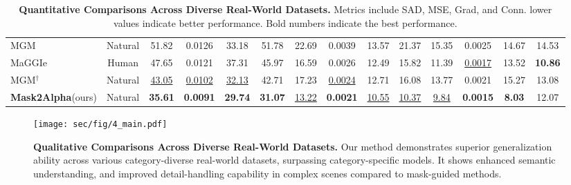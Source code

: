 \begin{table*}[t]
{\begin{tabular}{l|c|c|c|c|c|c|c|c|c|c|c|c|c}
    MGM~\cite{yu2021mgm} & Natural            & 51.82 & 0.0126 & 33.18 & 51.78 & 22.69 & 0.0039 & 13.57 & 21.37 & 15.35 & 0.0025 & 14.67 & 14.53 \\
    MaGGIe~\cite{huynh2024maggie} & Human     & 47.65 & 0.0121 & 37.31 & 45.97 & 16.59 & 0.0026 & 12.49 & 15.82 & 11.39 & \underline{0.0017} & 13.52 & \textbf{10.86} \\
    MGM$^\dagger$~\cite{park2023mgmwild}& Natural & \underline{43.05} & \underline{0.0102} & \underline{32.13} & 42.71 & 17.23 & \underline{0.0024} & 12.71 & 16.08 & 13.77 & 0.0021 & 15.27 & 13.08 \\
    \textbf{Mask2Alpha}(ours) & Natural & \textbf{35.61} & \textbf{0.0091} & \textbf{29.74} & \textbf{31.07} & \underline{13.22} & \textbf{0.0021} & \underline{10.55} & 
    \underline{10.37} & \underline{9.84} & \textbf{0.0015} & \textbf{8.03} & 12.07 \\

        \hline\hline       
    \end{tabular}}
    \vspace{-0.1in}
    \caption{{\bf Quantitative Comparisons Across Diverse Real-World Datasets.} Metrics include SAD, MSE, Grad, and Conn. lower values indicate better performance. Bold numbers indicate the best performance.}
    \label{tab:main}
    \vspace{-0.1in}
\end{table*}

\begin{figure*}
    \centering
    \texttt{[image: sec/fig/4\_main.pdf]}
    \vspace{-0.25in}
    \caption{{\bf Qualitative Comparisons Across Diverse Real-World Datasets.} Our method demonstrates superior generalization ability across various category-diverse real-world datasets, surpassing category-specific models. It shows enhanced semantic understanding, and improved detail-handling capability in complex scenes compared to mask-guided methods.}
    \label{fig:mainres}
    \vspace{-0.2in}
\end{figure*}

